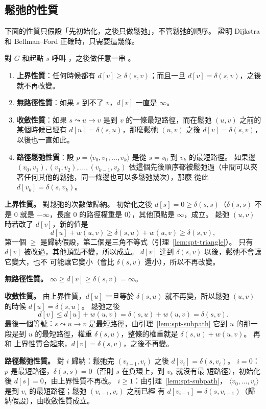 \subsection{鬆弛的性質}

下面的性質只假設「先初始化，之後只做鬆弛」，不管鬆弛的順序。 證明 Dijkstra 和
Bellman--Ford 正確時，只需要這幾條。

\begin{theorem}[鬆弛的性質]
\label{thm:spt-props}
對 $G$ 和起點 $s$ 呼叫 ，之後做任意一串 。
\begin{enumerate}
\item \textbf{上界性質}：任何時候都有 $d[v] \ge \delta(s, v)$；而且一旦 $d[v] = \delta(s,
v)$，之後就不再改變。
\item \textbf{無路徑性質}：如果 $s$ 到不了 $v$，$d[v]$ 一直是 $\infty$。
\item \textbf{收斂性質}：如果 $s \leadsto u \to v$ 是到 $v$ 的一條最短路徑，而在鬆弛
$(u, v)$ 之前的某個時候已經有 $d[u] = \delta(s, u)$，那麼鬆弛 $(u, v)$ 之後
$d[v] = \delta(s, v)$，以後也一直如此。
\item \textbf{路徑鬆弛性質}：設 $p = \langle v_0, v_1, \ldots, v_k \rangle$ 是從
$s = v_0$ 到 $v_k$ 的最短路徑。 如果邊 $(v_0, v_1), (v_1, v_2), \ldots, (v_{k-1}, v_k)$
依這個先後順序都被鬆弛過（中間可以夾著任何其他的鬆弛，同一條邊也可以多鬆弛幾次），那麼
從此 $d[v_k] = \delta(s, v_k)$。
\end{enumerate}
\end{theorem}

\begin{whybox}[鬆弛的性質]
\textbf{上界性質。} 對鬆弛的次數做歸納。 初始化之後 $d[s] = 0 \ge \delta(s, s)$（$\delta(s,
s)$ 不是 $0$ 就是 $-\infty$，長度 $0$ 的路徑權重是 $0$），其他頂點是 $\infty$，成立。 鬆弛
$(u, v)$ 時若改了 $d[v]$，新的值是
\[
d[u] + w(u, v) \ge \delta(s, u) + w(u, v) \ge \delta(s, v),
\]
第一個 $\ge$ 是歸納假設，第二個是三角不等式（引理~\ref{lem:spt-triangle}）。 只有 $d[v]$
被改過，其他頂點不變，所以成立。 $d[v]$ 達到 $\delta(s, v)$ 以後，鬆弛不會讓它變大，也不
可能讓它變小（會比 $\delta(s, v)$ 還小），所以不再改變。

\textbf{無路徑性質。} $\infty \ge d[v] \ge \delta(s, v) = \infty$。

\textbf{收斂性質。} 由上界性質，$d[u]$ 一旦等於 $\delta(s, u)$ 就不再變，所以鬆弛 $(u, v)$
的時候 $d[u] = \delta(s, u)$。 鬆弛之後
\[
d[v] \le d[u] + w(u, v) = \delta(s, u) + w(u, v) = \delta(s, v).
\]
最後一個等號：$s \leadsto u \to v$ 是最短路徑，由引理~\ref{lem:spt-subpath} 它到 $u$ 的那一
段是到 $u$ 的最短路徑，權重 $\delta(s, u)$，整條的權重就是 $\delta(s, u) + w(u, v)$。 再和
上界性質合起來，$d[v] = \delta(s, v)$，之後不再變。

\textbf{路徑鬆弛性質。} 對 $i$ 歸納：鬆弛完 $(v_{i-1}, v_i)$ 之後 $d[v_i] = \delta(s,
v_i)$。 $i = 0$：$p$ 是最短路徑，$\delta(s, s) = 0$（否則 $s$ 在負環上，到 $v_k$ 就沒有最
短路徑），初始化後 $d[s] = 0$，由上界性質不再改。 $i \ge 1$：由引理~\ref{lem:spt-subpath}，
$\langle v_0, \ldots, v_i \rangle$ 是到 $v_i$ 的最短路徑；鬆弛 $(v_{i-1}, v_i)$ 之前已經
有 $d[v_{i-1}] = \delta(s, v_{i-1})$（歸納假設），由收斂性質成立。
\end{whybox}

